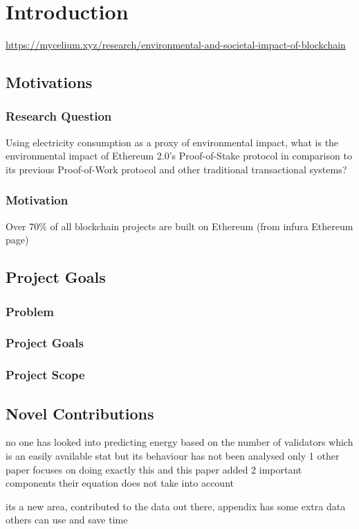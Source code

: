 \chapter{Introduction}
\url{https://mycelium.xyz/research/environmental-and-societal-impact-of-blockchain}
\section{Motivations}

\subsection{Research Question}

Using electricity consumption as a proxy of environmental impact, what is the environmental impact of Ethereum 2.0's Proof-of-Stake protocol in comparison to its previous Proof-of-Work protocol and other traditional transactional systems?

\subsection{Motivation}

Over 70\% of all blockchain projects are built on Ethereum (from infura Ethereum page)


\section{Project Goals}
\subsection{Problem}
\subsection{Project Goals}
\subsection{Project Scope}

\section{Novel Contributions}

no one has looked into predicting energy based on the number of validators which is an easily available stat but its behaviour has not been analysed
only 1 other paper focuses on doing exactly this and this paper added 2 important components their equation does not take into account

its a new area, contributed to the data out there, appendix has some extra data others can use and save time